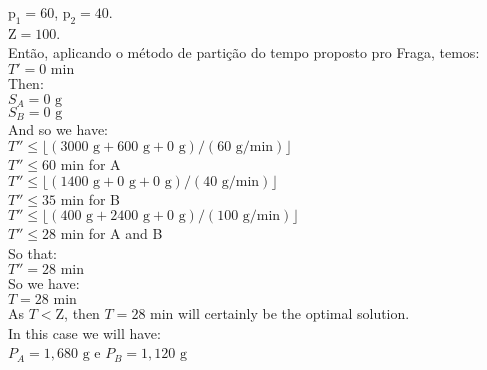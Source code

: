 \documentclass[authoryear,preprint,12pt]{elsarticle}
\begin{document}
$\textrm{p}_{1} = 60$,
$\textrm{p}_{2} = 40$.  \\

$\textrm{Z} = 100$.  \\

Então, aplicando o método de partição do tempo proposto pro Fraga, temos: \\

$T' = 0 \textrm{ min}$ \\

Then:\\

$S_A = 0 \textrm{ g}$ \\

$S_B = 0 \textrm{ g}$ \\

And so we have: \\

$T'' \leq \lfloor{(3000 \textrm{ g} + 600 \textrm{ g} + 0 \textrm{ g}) / (60 \textrm{ g}/\textrm{min})}\rfloor$ \\

$T'' \leq 60 \textrm{ min}$ \quad for A \\

$T'' \leq \lfloor{(1400 \textrm{ g} + 0 \textrm{ g} + 0 \textrm{ g}) / (40 \textrm{ g}/\textrm{min})}\rfloor$ \\

$T'' \leq 35 \textrm{ min}$ \quad for B \\

$T'' \leq \lfloor{(400 \textrm{ g} + 2400 \textrm{ g} + 0 \textrm{ g}) / (100 \textrm{ g}/\textrm{min})}\rfloor$ \\

$T'' \leq 28 \textrm{ min}$ \quad for A and B \\

So that: \\

$T'' = 28 \textrm{ min}$ \\

So we have: \\

$T = 28 \textrm{ min}$ \\

As $T<\textrm{Z}$, then $T = 28 \textrm{ min}$ will certainly be the optimal solution. \\

In this case we will have: \\

$P_A = 1,680  \textrm{ g}$ e $P_B=1,120 \textrm{ g}$ \\
\end{document}
